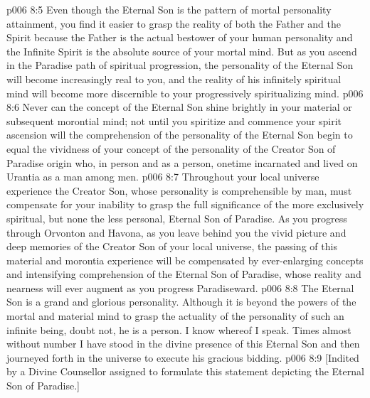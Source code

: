 \vs p006 8:5 \pc Even though the Eternal Son is the pattern of mortal personality attainment, you find it easier to grasp the reality of both the Father and the Spirit because the Father is the actual bestower of your human personality and the Infinite Spirit is the absolute source of your mortal mind. But as you ascend in the Paradise path of spiritual progression, the personality of the Eternal Son will become increasingly real to you, and the reality of his infinitely spiritual mind will become more discernible to your progressively spiritualizing mind.
\vs p006 8:6 Never can the concept of the Eternal Son shine brightly in your material or subsequent morontial mind; not until you spiritize and commence your spirit ascension will the comprehension of the personality of the Eternal Son begin to equal the vividness of your concept of the personality of the Creator Son of Paradise origin who, in person and as a person, onetime incarnated and lived on Urantia as a man among men.
\vs p006 8:7 Throughout your local universe experience the Creator Son, whose personality is comprehensible by man, must compensate for your inability to grasp the full significance of the more exclusively spiritual, but none the less personal, Eternal Son of Paradise. As you progress through Orvonton and Havona, as you leave behind you the vivid picture and deep memories of the Creator Son of your local universe, the passing of this material and morontia experience will be compensated by ever\hyp{}enlarging concepts and intensifying comprehension of the Eternal Son of Paradise, whose reality and nearness will ever augment as you progress Paradiseward.
\vs p006 8:8 \pc The Eternal Son is a grand and glorious personality. Although it is beyond the powers of the mortal and material mind to grasp the actuality of the personality of such an infinite being, doubt not, he is a person. I know whereof I speak. Times almost without number I have stood in the divine presence of this Eternal Son and then journeyed forth in the universe to execute his gracious bidding.
\vsetoff
\vs p006 8:9 [Indited by a Divine Counsellor assigned to formulate this statement depicting the Eternal Son of Paradise.]
\quizlink
